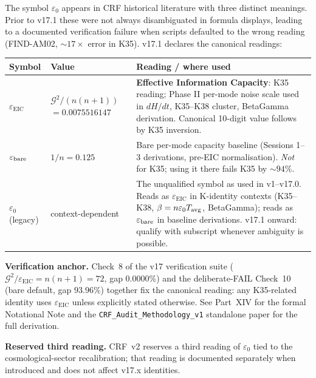 \documentclass[12pt, a4paper]{article}
\begin{document}
\begin{formalbox}[title={v17.1 Notation Disambiguation: The Three Readings of $\varepsilon_0$}]
The symbol $\varepsilon_0$ appears in CRF historical literature with three
distinct meanings. Prior to v17.1 these were not always disambiguated in
formula displays, leading to a documented verification failure when scripts
defaulted to the wrong reading (FIND-AM02, $\sim 17\times$ error in K35).
v17.1 declares the canonical readings:

\begin{center}
\renewcommand{\arraystretch}{1.40}
\begin{tabular}{p{3.5cm} p{3.4cm} p{6.0cm}}
\toprule
\textbf{Symbol} & \textbf{Value} & \textbf{Reading / where used} \\
\midrule
$\varepsilon_{\mathrm{EIC}}$
  & $\mathcal{G}^2/(n(n+1))$ \newline $= 0.0075516147$
  & \textbf{Effective Information Capacity}: K35 reading;
    Phase II per-mode noise scale used in $dH/dt$, K35--K38 cluster,
    BetaGamma derivation. Canonical 10-digit value follows by K35 inversion. \\
$\varepsilon_{\rm bare}$
  & $1/n = 0.125$
  & Bare per-mode capacity baseline (Sessions 1--3 derivations,
    pre-EIC normalisation). \emph{Not} for K35; using it there
    fails K35 by $\sim 94\%$. \\
$\varepsilon_0$ (legacy)
  & context-dependent
  & The unqualified symbol as used in v1--v17.0. Reads as
    $\varepsilon_{\mathrm{EIC}}$ in K-identity contexts (K35--K38,
    $\beta = n\varepsilon_0 T_{\rm avg}$, BetaGamma); reads as
    $\varepsilon_{\rm bare}$ in baseline derivations. v17.1 onward:
    qualify with subscript whenever ambiguity is possible. \\
\bottomrule
\end{tabular}
\end{center}

\medskip
\textbf{Verification anchor.} Check~8 of the v17 verification suite
($\mathcal{G}^2/\varepsilon_{\mathrm{EIC}} = n(n+1) = 72$,
gap $0.0000\%$) and the deliberate-FAIL Check~10 (bare default,
gap $93.96\%$) together fix the canonical reading: any K35-related
identity uses $\varepsilon_{\mathrm{EIC}}$ unless explicitly stated
otherwise. See Part~XIV for the formal Notational Note and the
\texttt{CRF\_Audit\_Methodology\_v1} standalone paper for the full
derivation.

\textbf{Reserved third reading.} CRF~v2 reserves a third reading of
$\varepsilon_0$ tied to the cosmological-sector recalibration; that
reading is documented separately when introduced and does not affect
v17.x identities.
\end{formalbox}
\end{document}
